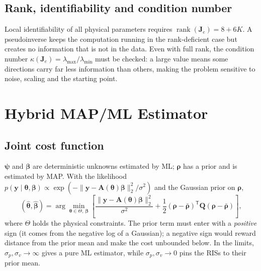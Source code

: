 \documentclass[11pt,a4paper]{article}
\newcommand{\vect}[1]{\bm{#1}}
\newcommand{\T}{\mathsf{T}}
\DeclareMathOperator{\rank}{rank}
\begin{document}
\subsection{Rank, identifiability and condition number}
Local identifiability of all physical parameters requires $\rank(\vect{J}_e)=8+6K$. A pseudoinverse keeps the
computation running in the rank-deficient case but creates no information that is not in the data. Even with full
rank, the condition number $\kappa(\vect{J}_e)=\lambda_{\max}/\lambda_{\min}$ must be checked: a large value means
some directions carry far less information than others, making the problem sensitive to noise, scaling and the
starting point.

\section{Hybrid MAP/ML Estimator}

\subsection{Joint cost function}
$\vect{\psi}$ and $\vect{\beta}$ are deterministic unknowns estimated by ML; $\vect{\rho}$ has a prior and is
estimated by MAP. With the likelihood $p(\vect{y}\mid\vect{\theta},\vect{\beta})\propto
\exp(-\|\vect{y}-\vect{A}(\vect{\theta})\vect{\beta}\|_2^2/\sigma^2)$ and the Gaussian prior on $\vect{\rho}$,
\begin{equation}
(\hat{\vect{\theta}},\hat{\vect{\beta}})=\arg\min_{\vect{\theta}\in\Theta,\ \vect{\beta}}
\left[\frac{\|\vect{y}-\vect{A}(\vect{\theta})\vect{\beta}\|_2^2}{\sigma^2}
+\frac{1}{2}(\vect{\rho}-\bar{\vect{\rho}})^{\T}\vect{Q}(\vect{\rho}-\bar{\vect{\rho}})\right],
\end{equation}
where $\Theta$ holds the physical constraints. The prior term must enter with a \emph{positive} sign (it comes
from the negative log of a Gaussian); a negative sign would reward distance from the prior mean and make the cost
unbounded below. In the limits, $\sigma_p,\sigma_v\to\infty$ gives a pure ML estimator, while
$\sigma_p,\sigma_v\to0$ pins the RISs to their prior mean.
\end{document}
